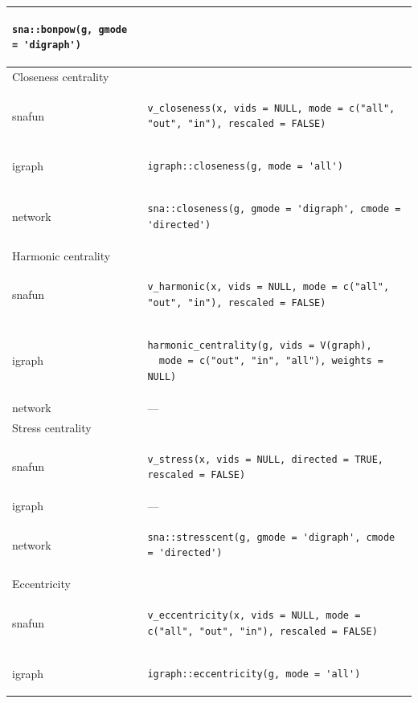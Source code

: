 \documentclass[
]{article}
\begin{document}
\begin{longtable}{ll}
\begin{verbatim}
sna::bonpow(g, gmode = 'digraph')
\end{verbatim} \\ 
\midrule
\multicolumn{1}{l}{Closeness centrality} \\ 
\midrule
snafun & \begin{verbatim}
v_closeness(x, vids = NULL, mode = c("all", "out", "in"), rescaled = FALSE)
\end{verbatim} \\ 
igraph & \begin{verbatim}
igraph::closeness(g, mode = 'all')
\end{verbatim} \\ 
network & \begin{verbatim}
sna::closeness(g, gmode = 'digraph', cmode = 'directed')
\end{verbatim} \\ 
\midrule
\multicolumn{1}{l}{Harmonic centrality} \\ 
\midrule
snafun & \begin{verbatim}
v_harmonic(x, vids = NULL, mode = c("all", "out", "in"), rescaled = FALSE)
\end{verbatim} \\ 
igraph & \begin{verbatim}
harmonic_centrality(g, vids = V(graph), 
  mode = c("out", "in", "all"), weights = NULL)
\end{verbatim} \\ 
network & — \\ 
\midrule
\multicolumn{1}{l}{Stress centrality} \\ 
\midrule
snafun & \begin{verbatim}
v_stress(x, vids = NULL, directed = TRUE, rescaled = FALSE)
\end{verbatim} \\ 
igraph & — \\ 
network & \begin{verbatim}
sna::stresscent(g, gmode = 'digraph', cmode = 'directed')
\end{verbatim} \\ 
\midrule
\multicolumn{1}{l}{Eccentricity} \\ 
\midrule
snafun & \begin{verbatim}
v_eccentricity(x, vids = NULL, mode = c("all", "out", "in"), rescaled = FALSE)
\end{verbatim} \\ 
igraph & \begin{verbatim}
igraph::eccentricity(g, mode = 'all')
\end{verbatim} \\ 

\end{longtable}
\end{document}
